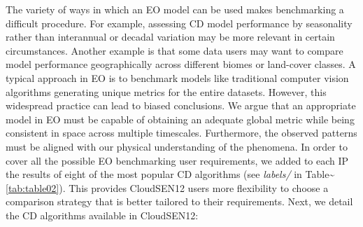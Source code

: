 \documentclass[a4paper, nobind]{templates/cdethesis}
\begin{document}
The variety of ways in which an EO model can be used makes benchmarking a difficult procedure\cite{CMIXRSE22}. For example, assessing CD model performance by seasonality rather than interannual or decadal variation may be more relevant in certain circumstances. Another example is that some data users may want to compare model performance geographically across different biomes or land-cover classes. A typical approach in EO is to benchmark models like traditional computer vision algorithms generating unique metrics for the entire datasets. However, this widespread practice can lead to biased conclusions. We argue that an appropriate model in EO must be capable of obtaining an adequate global metric while being consistent in space across multiple timescales. Furthermore, the observed patterns must be aligned with our physical understanding of the phenomena. In order to cover all the possible EO benchmarking user requirements, we added to each IP the results of eight of the most popular CD algorithms (see \textit{labels/} in Table\textasciitilde{}\ref{tab:table02}). This provides CloudSEN12 users more flexibility to choose a comparison strategy that is better tailored to their requirements. Next, we detail the CD algorithms available in CloudSEN12:
\end{document}
